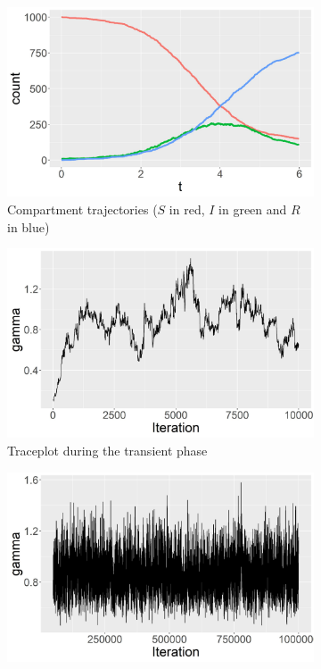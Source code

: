 \documentclass[11pt]{article}
\begin{document}
	\begin{figure}
		\centering
		\begin{subfigure}[b]{0.32\textwidth}
			\centering
			\includegraphics[width=\textwidth]{E1_trajectories}
			\caption{Compartment trajectories ($S$ in red, $I$ in green and $R$ in blue)}
			\label{fig:E1_trajectories}
		\end{subfigure}
		\hfill
		\begin{subfigure}[b]{0.32\textwidth}
			\centering
			\includegraphics[width=\textwidth]{E1_short_no_burn_gamma_tp}
			\caption{Traceplot during the transient phase}
			\label{fig:E1_short_no_burn_gamma_tp}
		\end{subfigure}
		\hfill
		\begin{subfigure}[b]{0.32\textwidth}
			\centering
			\includegraphics[width=\textwidth]{E1_burn_gamma_tp}

\end{subfigure}
\end{figure}
\end{document}
